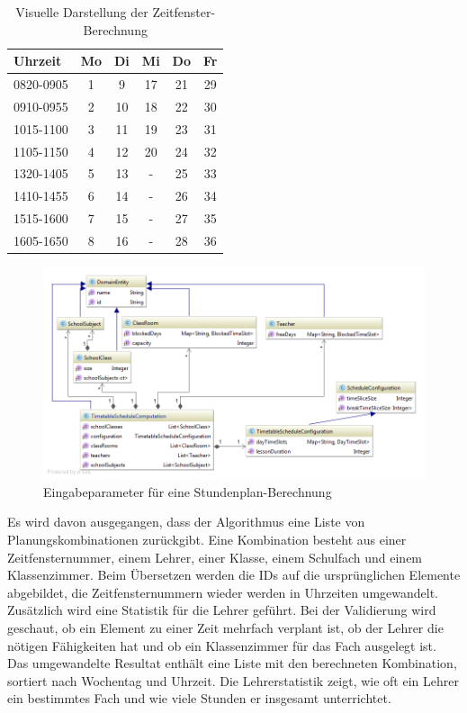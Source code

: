 \begin{table}[ht]
\centering
  \begin{tabular}{ l | c | c | c | c | c }
	\hline
	\rowcolor{gray}
	\textbf{Uhrzeit} 	& \textbf{Mo}	& \textbf{Di} 	& \textbf{Mi}	&  \textbf{Do}	&  \textbf{Fr}\\ \hline
	0820-0905		& 1			& 9			& 17			& 21			& 29		\\ \hline
	0910-0955		& 2			& 10			& 18			& 22			& 30		\\ \hline
	1015-1100		& 3			& 11			& 19			& 23			& 31		\\ \hline
	1105-1150		& 4			& 12			& 20			& 24			& 32		\\ \hline \hline
	1320-1405		& 5			& 13			& -			& 25			& 33		\\ \hline
	1410-1455		& 6			& 14			& -			& 26			& 34		\\ \hline
	1515-1600		& 7			& 15			& -			& 27			& 35		\\ \hline
	1605-1650		& 8			& 16			& -			& 28			& 36		\\ \hline
  \end{tabular}
   \caption{Visuelle Darstellung der Zeitfenster-Berechnung}\label{table:timeslice_calc}
\end{table}

\begin{figure}[h]
\centering
\includegraphics[scale=0.5]{images/probleme/timetableSchedule.png}
\caption[Eingabeparameter für eine Stundenplan-Berechnung]{Eingabeparameter für eine Stundenplan-Berechnung \selfmade{}}
\label{fig:timetableSchedule_input}
\end{figure}

\FloatBarrier

Es wird davon ausgegangen, dass der Algorithmus eine Liste von Planungskombinationen zurückgibt. Eine Kombination besteht aus einer Zeitfensternummer, einem Lehrer, einer Klasse, 
einem Schulfach und einem Klassenzimmer. Beim Übersetzen werden die IDs auf die ursprünglichen Elemente abgebildet, die Zeitfensternummern wieder werden in Uhrzeiten umgewandelt. 
Zusätzlich wird eine Statistik für die Lehrer geführt. Bei der Validierung wird geschaut, ob ein Element zu einer Zeit mehrfach verplant ist, ob der Lehrer die nötigen Fähigkeiten hat und ob ein 
Klassenzimmer für das Fach ausgelegt ist. Das umgewandelte Resultat enthält eine Liste mit den berechneten Kombination, sortiert nach Wochentag und Uhrzeit. Die Lehrerstatistik zeigt, wie 
oft ein Lehrer ein bestimmtes Fach und wie viele Stunden er insgesamt unterrichtet.


